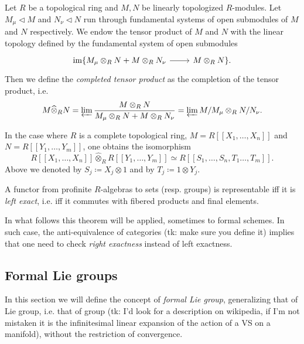 \documentclass[../Main]{subfiles}
\begin{document}
\begin{defn}
	Let $R$ be a topological ring and $M, N$ be linearly topologized $R$-modules.
	Let $M_\mu \triangleleft M$ and $N_\nu \triangleleft N$ run through
	fundamental systems of open submodules of $M$ and $N$ respectively.
	We endow the tensor product of $M$ and $N$ with the linear topology
	defined by the fundamental system of open submodules
	\begin{equation*}
	\begin{tikzcd}
	\ima \{ M_\mu \otimes_R N + M \otimes_R N_\nu 
		\arrow[r, "", rightarrow] &
	M \otimes_R N \}
	.\end{tikzcd}
	\end{equation*}
	Then we define the {\em completed tensor product} as the completion
	of the tensor product, i.e.
	\begin{equation*}
		M \widehat{\otimes}_R N = 
		\varprojlim \frac{M \otimes_R N}{M_\mu \otimes_R N +
		M \otimes_R N_\nu} =
		\varprojlim M / M_\mu \otimes_R N / N_\nu
	.\end{equation*}
\end{defn}


\begin{rem}[]
	In the case where $R$ is a complete topological ring,
	$M = R [\![ X_1, \ldots, X_{ n } ]\!]$
	and $N = R [\![ Y_1, \ldots, Y_{ m } ]\!]$,
	one obtains the isomorphism
	\begin{equation*}
		R [\![ X_1, \ldots, X_{ n } ]\!] \widehat{\otimes}_R
		R [\![ Y_1, \ldots, Y_{ m } ]\!] \simeq
		R [\![ S_1, \ldots, S_n, T_1 \ldots, T_{ m } ]\!]
	.\end{equation*}
	Above we denoted by $S_j \coloneqq X_j \otimes 1$
	and by $T_j \coloneqq 1 \otimes Y_j$.
\end{rem}


\begin{thm}
	A functor from profinite $R$-algebras to sets (resp$.$ groups)
	is representable iff it is {\em left exact}, i.e.
	iff it commutes with fibered products and final elements.
\end{thm}
In what follows this theorem will be applied, sometimes
to formal schemes. In such case, the anti-equivalence of categories (tk: make sure you define it)
implies that one need to check {\em right exactness} instead of left exactness.



\subsection{Formal Lie groups}
In this section we will define the concept of {\em formal Lie group},
generalizing that of Lie group, i.e. that of group (tk: I'd look for a description
on wikipedia, if I'm not mistaken it is the infinitesimal linear expansion of
the action of a VS on a manifold), without the restriction of convergence.
\end{document}
